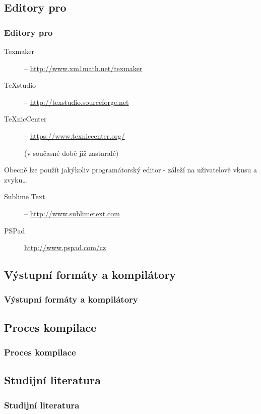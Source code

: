 \subsection{Editory pro }
\begin{frame}
	\frametitle{Editory pro }
	\begin{description}
		\item[Texmaker] -- \url{http://www.xm1math.net/texmaker}
		\item[TeXstudio] -- \url{http://texstudio.sourceforge.net}
		\item[TeXnicCenter] -- \url{https://www.texniccenter.org/}\par{}(v současné době již zastaralé)
	\end{description}
	\par
	Obecně lze použít jakýkoliv programátorský editor - záleží na uživatelově vkusu a zvyku\ldots
	\begin{description}
		\item[Sublime Text] -- \url{http://www.sublimetext.com}
		\item[PSPad]\url{http://www.pspad.com/cz}
	\end{description}
\end{frame}


\subsection{Výstupní formáty a kompilátory}
\begin{frame}
	\frametitle{Výstupní formáty a kompilátory}
	\centering
	\resizebox{\textwidth}{!}{}
\end{frame}


\subsection{Proces kompilace}
\begin{frame}
	\frametitle{Proces kompilace}
	\centering
	
\end{frame}


\subsection{Studijní literatura}
\begin{refsection}
	\nocite{Satrapa2023, Kopka2004, Oetiker2011, Oetiker2018, Kopka1999, Lamport1994, Mittelbach2004, Beran2007, Kocicka2004, Felici2003}
	\begin{frame}[t, allowframebreaks]
		\frametitle{Studijní literatura}
		\printbibliography[heading=none]
	\end{frame}
\end{refsection}


